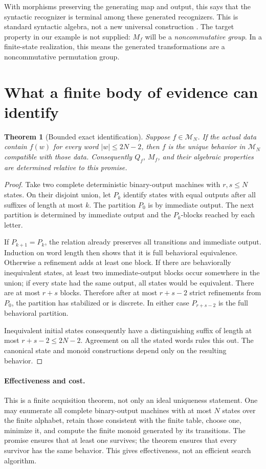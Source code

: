 \documentclass[11pt]{article}
\newtheorem{theorem}{Theorem}[section]
\theoremstyle{remark}
\newcommand{\M}{\mathcal M}
\begin{document}
With morphisms preserving the generating map and output, this says that the syntactic recognizer is terminal among these generated recognizers. This is standard syntactic algebra, not a new universal construction \cite{Syntactic}. The target property in our example is not supplied: $M_f$ will be a \emph{noncommutative group}. In a finite-state realization, this means the generated transformations are a noncommutative permutation group.

\section{What a finite body of evidence can identify}
\label{sec:finite}

\begin{theorem}[Bounded exact identification]
\label{thm:finite}
Suppose $f\in\M_N$. If the actual data contain $f(w)$ for every word $|w|\le2N-2$, then $f$ is the unique behavior in $\M_N$ compatible with those data. Consequently $Q_f$, $M_f$, and their algebraic properties are determined relative to this promise.
\end{theorem}
\begin{proof}
Take two complete deterministic binary-output machines with $r,s\le N$ states. On their disjoint union, let $P_k$ identify states with equal outputs after all suffixes of length at most $k$. The partition $P_0$ is by immediate output. The next partition is determined by immediate output and the $P_k$-blocks reached by each letter.

If $P_{k+1}=P_k$, the relation already preserves all transitions and immediate output. Induction on word length then shows that it is full behavioral equivalence. Otherwise a refinement adds at least one block. If there are behaviorally inequivalent states, at least two immediate-output blocks occur somewhere in the union; if every state had the same output, all states would be equivalent. There are at most $r+s$ blocks. Therefore after at most $r+s-2$ strict refinements from $P_0$, the partition has stabilized or is discrete. In either case $P_{r+s-2}$ is the full behavioral partition.

Inequivalent initial states consequently have a distinguishing suffix of length at most $r+s-2\le2N-2$. Agreement on all the stated words rules this out. The canonical state and monoid constructions depend only on the resulting behavior.
\end{proof}

\paragraph{Effectiveness and cost.}
This is a finite acquisition theorem, not only an ideal uniqueness statement. One may enumerate all complete binary-output machines with at most $N$ states over the finite alphabet, retain those consistent with the finite table, choose one, minimize it, and compute the finite monoid generated by its transitions. The promise ensures that at least one survives; the theorem ensures that every survivor has the same behavior. This gives effectiveness, not an efficient search algorithm.
\end{document}
